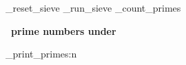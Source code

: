 \documentclass[a4paper]{article}
\begin{document}
\ExplSyntaxOn
\prime_reset_sieve
\prime_run_sieve
\prime_count_primes
\ExplSyntaxOff

{\Large\bf
    \ExplSyntaxOff\ 
        prime numbers under
    \ExplSyntaxOff
}\\[1cm]

\begin{multicols}{8}
\footnotesize
\noindent
\ExplSyntaxOn
\prime_print_primes:n{\\}
\ExplSyntaxOff
\end{multicols}
\end{document}
